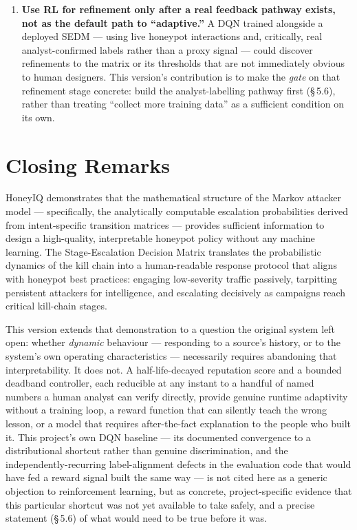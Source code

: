 \begin{enumerate}
  \item \textbf{Use RL for refinement only after a real feedback pathway
        exists, not as the default path to ``adaptive.''}
        A DQN trained alongside a deployed SEDM --- using live honeypot
        interactions and, critically, real analyst-confirmed labels rather
        than a proxy signal --- could discover refinements to the matrix or
        its thresholds that are not immediately obvious to human designers.
        This version's contribution is to make the \emph{gate} on that
        refinement stage concrete: build the analyst-labelling pathway first
        (\S\,5.6), rather than treating ``collect more training data'' as a
        sufficient condition on its own.
\end{enumerate}

\section{Closing Remarks}

HoneyIQ demonstrates that the mathematical structure of the Markov attacker
model --- specifically, the analytically computable escalation probabilities
derived from intent-specific transition matrices --- provides sufficient
information to design a high-quality, interpretable honeypot policy without
any machine learning.
The Stage-Escalation Decision Matrix translates the probabilistic dynamics
of the kill chain into a human-readable response protocol that aligns with
honeypot best practices: engaging low-severity traffic passively, tarpitting
persistent attackers for intelligence, and escalating decisively as campaigns
reach critical kill-chain stages.

This version extends that demonstration to a question the original system
left open: whether \emph{dynamic} behaviour --- responding to a source's
history, or to the system's own operating characteristics --- necessarily
requires abandoning that interpretability.
It does not.
A half-life-decayed reputation score and a bounded deadband controller, each
reducible at any instant to a handful of named numbers a human analyst can
verify directly, provide genuine runtime adaptivity without a training loop,
a reward function that can silently teach the wrong lesson, or a model that
requires after-the-fact explanation to the people who built it.
This project's own DQN baseline --- its documented convergence to a
distributional shortcut rather than genuine discrimination, and the
independently-recurring label-alignment defects in the evaluation code that
would have fed a reward signal built the same way --- is not cited here as a
generic objection to reinforcement learning, but as concrete,
project-specific evidence that this particular shortcut was not yet available
to take safely, and a precise statement (\S\,5.6) of what would need to be
true before it was.

